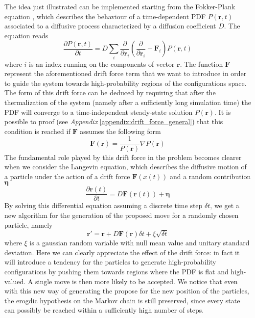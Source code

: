 The idea just illustrated can be implemented starting from the Fokker-Plank equation \cite{lectures2015}, which describes the behaviour of a time-dependent PDF $P(\bm{r}, t)$ associated to a diffusive process characterized by a diffusion coefficient $D$. The equation reads
\begin{equation*}
    \frac{\partial P(\bm{r}, t)}{\partial t} = D \sum_i \frac{\partial}{\partial \bm{r}_i} \left( \frac{\partial}{\partial \bm{r}_i} - \bm{F}_i \right) P(\bm{r}, t)
\end{equation*}
where $i$ is an index running on the components of vector $\bm{r}$. The function $\bm{F}$ represent the aforementioned drift force term that we want to introduce in order to guide the system towards high-probability regions of the configurations space. The form of this drift force can be deduced by requiring that after the thermalization of the system (namely after a sufficiently long simulation time) the PDF will converge to a time-independent steady-state solution $P(\bm{r})$. It is possible to proof (see \textit{Appendix} \ref{appendix:drift_force_general}) that this condition is reached if $\bm{F}$ assumes the following form
\begin{equation*}
    \bm{F}(\bm{r}) = \frac{1}{P(\bm{r})} \nabla P(\bm{r})
\end{equation*}
The fundamental role played by this drift force in the problem becomes clearer when we consider the Langevin equation, which describes the diffusive motion of a particle under the action of a drift force $\bm{F}(x(t))$ and a random contribution $\bm{\eta}$ 
\begin{equation*}
    \frac{\partial \bm{r}(t)}{\partial t} = D \bm{F}(\bm{r}(t)) + \bm{\eta}  
\end{equation*}
By solving this differential equation assuming a discrete time step $\delta t$, we get a new algorithm for the generation of the proposed move for a randomly chosen particle, namely
\begin{equation}
    \bm{r}' = \bm{r} + D \bm{F}(\bm{r}) \delta t + \xi \sqrt{\delta t}
    \label{new_position_importance}
\end{equation}
where $\xi$ is a gaussian random variable with null mean value and unitary standard deviation. Here we can clearly appreciate the effect of the drift force: in fact it will introduce a tendency for the particles to generate high-probability configurations by pushing them towards regions where the PDF is flat and high-valued. A single move is then more likely to be accepted. We notice that even with this new way of generating the propose for the new position of the particles, the erogdic hypothesis on the Markov chain is still preserved, since every state can possibly be reached within a sufficiently high number of steps. 

